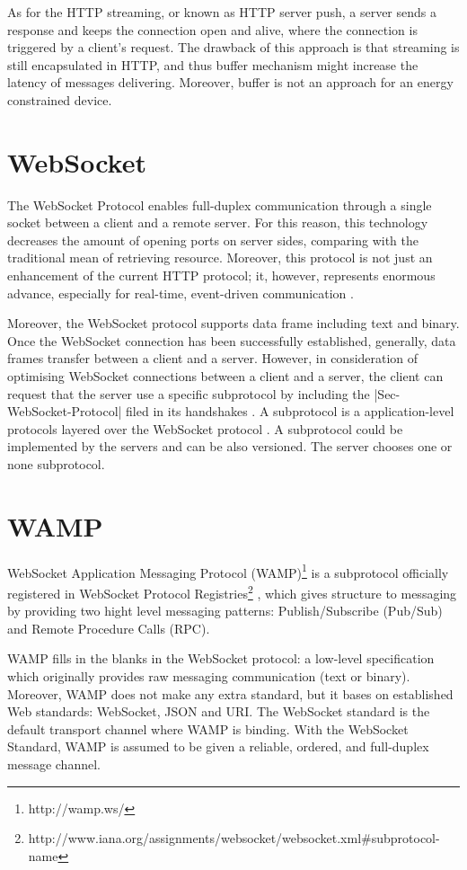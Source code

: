As for the HTTP streaming, or known as HTTP server push, a server sends a response and keeps the connection open and alive, where the connection is triggered by a client's request. The drawback of this approach is that streaming is still encapsulated in HTTP, and thus buffer mechanism might increase the latency of messages delivering. Moreover, buffer is not an approach for an energy constrained device.

\section{WebSocket}

The WebSocket Protocol enables full-duplex communication through a single socket between a client and a remote server. For this reason, this technology decreases the amount of opening ports on server sides, comparing with the traditional mean of retrieving resource. Moreover, this protocol is not just an enhancement of the current HTTP protocol; it, however, represents enormous advance, especially for real-time, event-driven communication \cite{lubbers2010html5}.

Moreover, the WebSocket protocol supports data frame including text and binary. Once the WebSocket connection has been successfully established, generally, data frames transfer between a client and a server. However, in consideration of optimising WebSocket connections between a client and a server, the client can request that the server use a specific subprotocol by including the |Sec-WebSocket-Protocol| filed in its handshakes \cite{rfc64552012web}. A subprotocol is a application-level protocols layered over the WebSocket protocol \cite{rfc64552012web}. A subprotocol could be implemented by the servers and can be also versioned. The server chooses one or none subprotocol. 

\section{WAMP}

WebSocket Application Messaging Protocol (WAMP)\footnote{http://wamp.ws/} is a subprotocol officially registered in WebSocket Protocol Registries\footnote{http://www.iana.org/assignments/websocket/websocket.xml\#subprotocol-name} , which gives structure to messaging by providing two hight level messaging patterns: Publish/Subscribe (Pub/Sub) and Remote Procedure Calls (RPC).

WAMP fills in the blanks in the WebSocket protocol: a low-level specification which originally provides raw messaging communication (text or binary). Moreover, WAMP does not make any extra standard, but it bases on established Web standards: WebSocket, JSON and URI. The WebSocket standard is the default transport channel where WAMP is binding. With the WebSocket Standard, WAMP is assumed to be given a reliable, ordered, and full-duplex message channel. 

